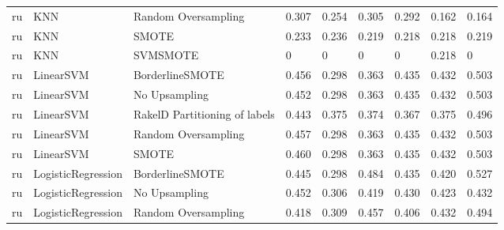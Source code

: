 \begin{tabular}{lllllllll}
      ru &                             KNN &           Random Oversampling & 0.307 &                     0.254 &                 0.305 &                  0.292 &                                   0.162 &     0.164 \\
      ru &                             KNN &                         SMOTE & 0.233 &                     0.236 &                 0.219 &                  0.218 &                                   0.218 &     0.219 \\
      ru &                             KNN &                      SVMSMOTE &     0 &                         0 &                     0 &                      0 &                                   0.218 &         0 \\
      ru &                       LinearSVM &               BorderlineSMOTE & 0.456 &                     0.298 &                 0.363 &                  0.435 &                                   0.432 &     0.503 \\
      ru &                       LinearSVM &                 No Upsampling & 0.452 &                     0.298 &                 0.363 &                  0.435 &                                   0.432 &     0.503 \\
      ru &                       LinearSVM & RakelD Partitioning of labels & 0.443 &                     0.375 &                 0.374 &                  0.367 &                                   0.375 &     0.496 \\
      ru &                       LinearSVM &           Random Oversampling & 0.457 &                     0.298 &                 0.363 &                  0.435 &                                   0.432 &     0.503 \\
      ru &                       LinearSVM &                         SMOTE & 0.460 &                     0.298 &                 0.363 &                  0.435 &                                   0.432 &     0.503 \\
      ru &              LogisticRegression &               BorderlineSMOTE & 0.445 &                     0.298 &                 0.484 &                  0.435 &                                   0.420 &     0.527 \\
      ru &              LogisticRegression &                 No Upsampling & 0.452 &                     0.306 &                 0.419 &                  0.430 &                                   0.423 &     0.432 \\
      ru &              LogisticRegression &           Random Oversampling & 0.418 &                     0.309 &                 0.457 &                  0.406 &                                   0.432 &     0.494 \\

\end{tabular}
